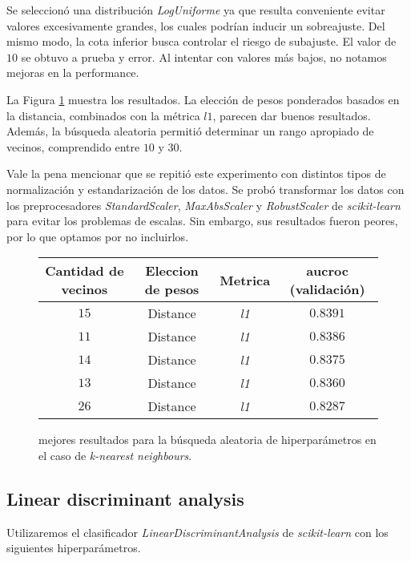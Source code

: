 Se seleccionó una distribución \textit{LogUniforme} ya que resulta conveniente evitar valores excesivamente grandes, los cuales podrían inducir un sobreajuste. Del mismo modo, la cota inferior busca controlar el riesgo de subajuste. El valor de $10$ se obtuvo a prueba y error. Al intentar con valores más bajos, no notamos mejoras en la performance. 

La Figura \ref{knn} muestra los resultados. La elección de pesos ponderados basados en la distancia, combinados con la métrica $l1$, parecen dar buenos resultados. Además, la búsqueda aleatoria permitió determinar un rango apropiado de vecinos, comprendido entre $10$ y $30$.

Vale la pena mencionar que se repitió este experimento con distintos tipos de normalización y estandarización de los datos. Se probó transformar los datos con los preprocesadores \textit{StandardScaler}, \textit{MaxAbsScaler} y \textit{RobustScaler} de \textit{scikit-learn} para evitar los problemas de escalas. Sin embargo, sus resultados fueron peores, por lo que optamos por no incluirlos.
  
\vspace{0.5em}
\begin{figure}[!htbp]
    \begin{center}
        \begin{tabular}{ |c|c|c|c| } 
         \hline
        Cantidad de vecinos & Eleccion de pesos & Metrica  & aucroc (validación) \\
        \hline
        $15$             & Distance          & \textit{l1} & $0.8391$  \\ 
        $11$             & Distance          & \textit{l1} & $0.8386$  \\
        $14$             & Distance          & \textit{l1} & $0.8375$  \\ 
        $13$             & Distance          & \textit{l1} & $0.8360$  \\
        $26$             & Distance          & \textit{l1} & $0.8287$  \\ 
        \hline
        \end{tabular}
    \end{center}
    \caption{mejores resultados para la búsqueda aleatoria de hiperparámetros en el caso de \textit{k-nearest neighbours}.} \label{knn}
\end{figure}

\subsection{Linear discriminant analysis}
Utilizaremos el clasificador \textit{LinearDiscriminantAnalysis} de \textit{scikit-learn} con los siguientes hiperparámetros. 

